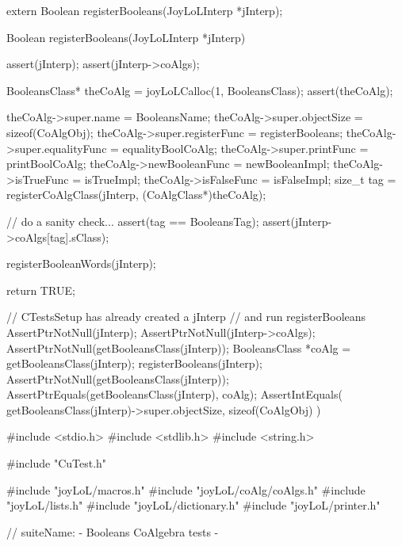 \stopCHeader

\startCHeader
extern Boolean registerBooleans(JoyLoLInterp *jInterp);
\stopCHeader
{}

\startCCode
Boolean registerBooleans(JoyLoLInterp *jInterp) {
  assert(jInterp);
  assert(jInterp->coAlgs);
  
  BooleansClass* theCoAlg
    = joyLoLCalloc(1, BooleansClass);
  assert(theCoAlg);
  
  theCoAlg->super.name         = BooleansName;
  theCoAlg->super.objectSize   = sizeof(CoAlgObj);
  theCoAlg->super.registerFunc = registerBooleans;
  theCoAlg->super.equalityFunc = equalityBoolCoAlg;
  theCoAlg->super.printFunc    = printBoolCoAlg;
  theCoAlg->newBooleanFunc     = newBooleanImpl;
  theCoAlg->isTrueFunc         = isTrueImpl;
  theCoAlg->isFalseFunc        = isFalseImpl;
  size_t tag =
    registerCoAlgClass(jInterp, (CoAlgClass*)theCoAlg);
  
  // do a sanity check...
  assert(tag == BooleansTag);
  assert(jInterp->coAlgs[tag].sClass);
  
  registerBooleanWords(jInterp);
  
  return TRUE;
}
\stopCCode


\startCTest
  // CTestsSetup has already created a jInterp
  // and run registerBooleans
  AssertPtrNotNull(jInterp);
  AssertPtrNotNull(jInterp->coAlgs);
  AssertPtrNotNull(getBooleansClass(jInterp));
  BooleansClass *coAlg = getBooleansClass(jInterp);
  registerBooleans(jInterp);
  AssertPtrNotNull(getBooleansClass(jInterp));
  AssertPtrEquals(getBooleansClass(jInterp), coAlg);
  AssertIntEquals(
    getBooleansClass(jInterp)->super.objectSize,
    sizeof(CoAlgObj)
  )
\stopCTest
\stopTestCase
\stopTestSuite

\starttyping
#include <stdio.h>
#include <stdlib.h>
#include <string.h>

#include "CuTest.h"

#include "joyLoL/macros.h"
#include "joyLoL/coAlg/coAlgs.h"
#include "joyLoL/lists.h"
#include "joyLoL/dictionary.h"
#include "joyLoL/printer.h"

// suiteName: - Booleans CoAlgebra tests -

